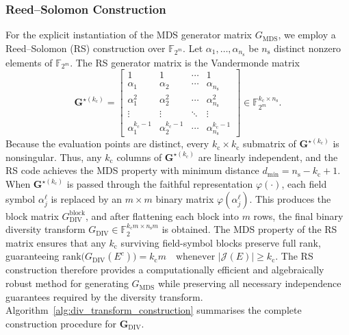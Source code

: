 \documentclass[lettersize,journal]{IEEEtran}
\begin{document}
\subsubsection*{Reed--Solomon Construction}
For the explicit instantiation of the MDS generator matrix 
$G_{\mathrm{MDS}}$, we employ a Reed--Solomon (RS) construction over 
$\mathbb{F}_{2^{m}}$. Let $\alpha_{1},\ldots,\alpha_{n_{\mathrm{s}}}$ 
be $n_{\mathrm{s}}$ distinct nonzero elements of $\mathbb{F}_{2^{m}}$. 
The RS generator matrix is the Vandermonde matrix
\begin{equation}
\mathbf{G}^{\star(k_{\mathrm{c}})} =
\begin{bmatrix}
1 & 1 & \cdots & 1 \\
\alpha_1 & \alpha_2 & \cdots & \alpha_{n_{\mathrm{s}}} \\
\alpha_1^2 & \alpha_2^2 & \cdots & \alpha_{n_{\mathrm{s}}}^2 \\
\vdots & \vdots & \ddots & \vdots \\
\alpha_1^{k_{\mathrm{c}}-1} & \alpha_2^{k_{\mathrm{c}}-1} & 
\cdots & \alpha_{n_{\mathrm{s}}}^{k_{\mathrm{c}}-1}
\end{bmatrix}
\in \mathbb{F}_{2^{m}}^{k_{\mathrm{c}} \times n_{\mathrm{s}}}.
\label{eq:RS_generator_final}
\end{equation}
Because the evaluation points are distinct, every 
$k_{\mathrm{c}} \times k_{\mathrm{c}}$ submatrix of 
$\mathbf{G}^{\star(k_{\mathrm{c}})}$ is nonsingular. Thus, any 
$k_{\mathrm{c}}$ columns of $\mathbf{G}^{\star(k_{\mathrm{c}})}$ 
are linearly independent, and the RS code achieves the MDS property 
with minimum distance $d_{\min} = n_{\mathrm{s}}-k_{\mathrm{c}}+1$. When $\mathbf{G}^{\star(k_{\mathrm{c}})}$ is passed through the 
faithful representation $\varphi(\cdot)$, each field symbol 
$\alpha_j^{\ell}$ is replaced by an $m \times m$ binary matrix 
$\varphi(\alpha_j^{\ell})$. This produces the block matrix 
$G_{\mathrm{DIV}}^{\mathrm{block}}$, and after flattening each 
block into $m$ rows, the final binary diversity transform
$G_{\mathrm{DIV}} \in \mathbb{F}_{2}^{k_{\mathrm{c}} m \times 
n_{\mathrm{s}} m}$
is obtained. The MDS property of the RS matrix ensures that any 
$k_{\mathrm{c}}$ surviving field-symbol blocks preserve full rank, 
guaranteeing $\mathrm{rank}\bigl(G_{\mathrm{DIV}}(E^{c})\bigr) = k_{\mathrm{c}} m \quad\text{whenever } |\mathcal{J}(E)| \ge k_{\mathrm{c}}.
$
The RS construction therefore provides a computationally efficient and  algebraically 
robust method for generating 
$G_{\mathrm{MDS}}$ while preserving all necessary independence 
guarantees required by the diversity transform. Algorithm~\ref{alg:div_transform_construction} summarises the complete construction procedure for $\mathbf{G}_{\mathrm{DIV}}$.
\end{document}
